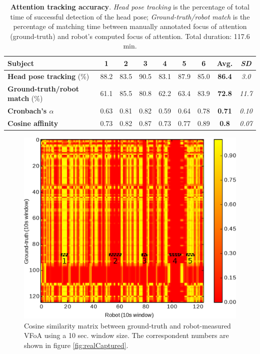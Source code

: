 \documentclass{sig-alternate}
\begin{document}
\begin{table}[h!]
    \centering
    \caption{\textbf{Attention tracking accuracy}. \emph{Head pose
    tracking} is the percentage of total time of successful detection of the
    head pose; \emph{Ground-truth/robot match} is the percentage of matching time
    between manually annotated focus of attention (ground-truth) and robot's
    computed focus of attention. Total duration: 117.6 min.}

    \begin{tabular}{p{5.5cm}cccccccc}
        \toprule
        {\bf Subject} & 1 & 2 & 3 & 4 & 5 & 6 & {\bf Avg.} & {\it SD} \\
        \midrule
        {\bf Head pose tracking} (\%) & 88.2 & 83.5 & 90.5 & 83.1 & 87.9 & 85.0 & {\bf 86.4} & {\it 3.0} \\ 
        \midrule
        {\bf Ground-truth/robot match} (\%) & 61.1 & 85.5 & 80.8 & 62.2 & 63.4 & 83.9 & {\bf 72.8} & {\it 11.7}\\
        {\bf Cronbach's $\alpha$} & 0.63 & 0.81 & 0.82 & 0.59 & 0.64 & 0.78 & {\bf0.71} & {\it0.10}\\
        {\bf Cosine affinity} & 0.73 & 0.82 & 0.87 & 0.73 & 0.77 & 0.89 & {\bf 0.8} & {\it 0.07} \\
        \bottomrule
    \end{tabular}
    \label{tab:results}
\end{table}

\begin{figure}[th!]
    \centering
    \includegraphics[width=0.7\columnwidth]{bitmap}
    \caption{\small Cosine similarity matrix between ground-truth and robot-measured VFoA
    using a 10 sec. window size. The correspondent numbers are shown
    in figure \ref{fig:realCaptured}.}
    \label{fig:cosinematrix}
\end{figure}
\end{document}
